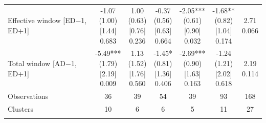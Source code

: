 \begin{threeparttable}
\begin{tabular}{@{}lcccccc}
Effective window [ED$-$1, ED+1] & \makecell{-1.07\\(1.00)\\{}[1.44]\\{0.683}} & \makecell{1.00\\(0.63)\\{}[0.76]\\{0.236}} & \makecell{-0.37\\(0.56)\\{}[0.63]\\{0.664}} & \makecell{-2.05***\\(0.61)\\{}[0.90]\\{0.032}} & \makecell{-1.68**\\(0.82)\\{}[1.04]\\{0.174}} & \makecell{2.71\\{0.066}} \\
\addlinespace[0.25ex]
\addlinespace[0.25ex]
Total window [AD$-$1, ED+1] & \makecell{-5.49***\\(1.79)\\{}[2.19]\\{0.009}} & \makecell{1.13\\(1.52)\\{}[1.76]\\{0.560}} & \makecell{-1.45*\\(0.81)\\{}[1.36]\\{0.406}} & \makecell{-2.69***\\(0.90)\\{}[1.63]\\{0.163}} & \makecell{-1.24\\(1.21)\\{}[2.02]\\{0.618}} & \makecell{2.19\\{0.114}} \\
\addlinespace[0.25ex]
\addlinespace[0.25ex]
Observations & 36 & 39 & 54 & 39 & 93 & 168 \\
\addlinespace[0.25ex]
\addlinespace[0.25ex]
Clusters & 10 & 6 & 6 & 5 & 11 & 27 \\
\addlinespace[0.25ex]
\bottomrule
\end{tabular}
\endgroup
\noindent\begin{minipage}{\linewidth}\smallskip\footnotesize

\end{minipage}
\end{threeparttable}
